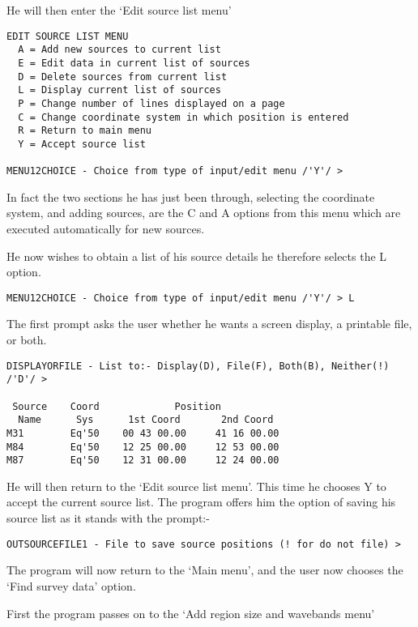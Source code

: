 He will then enter the `Edit source list menu'

\begin{verbatim}
EDIT SOURCE LIST MENU
  A = Add new sources to current list
  E = Edit data in current list of sources
  D = Delete sources from current list
  L = Display current list of sources
  P = Change number of lines displayed on a page
  C = Change coordinate system in which position is entered
  R = Return to main menu
  Y = Accept source list

MENU12CHOICE - Choice from type of input/edit menu /'Y'/ > 
\end{verbatim}

In fact the two sections he has just been through, selecting the coordinate
system, and adding sources, are the C and A options from this menu which are
executed automatically for new sources.

He now wishes to obtain a list of his source details he therefore selects
the L option.

\begin{verbatim}
MENU12CHOICE - Choice from type of input/edit menu /'Y'/ > L
\end{verbatim}

The first prompt asks the user whether he wants a screen display, a printable
file, or both.

\begin{verbatim}
DISPLAYORFILE - List to:- Display(D), File(F), Both(B), Neither(!) /'D'/ > 

 Source    Coord             Position
  Name      Sys      1st Coord       2nd Coord
M31        Eq'50    00 43 00.00     41 16 00.00
M84        Eq'50    12 25 00.00     12 53 00.00
M87        Eq'50    12 31 00.00     12 24 00.00
\end{verbatim}

He will then return to the `Edit source list menu'. This time he chooses
Y to accept the current source list. The program offers him the option
of saving his source list as it stands with the prompt:-

\begin{verbatim}
OUTSOURCEFILE1 - File to save source positions (! for do not file) > 
\end{verbatim}

The program will now return to the `Main menu', and the user now chooses
the `Find survey data' option. 

First the program passes on to the `Add region size and wavebands menu'


